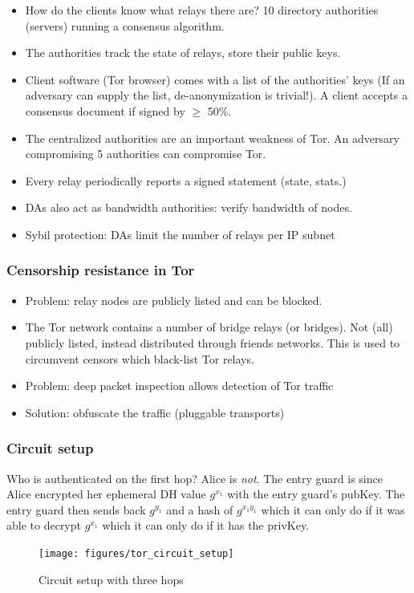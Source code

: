 \begin{itemize}
    \item How do the clients know what relays there are? 10 directory authorities (servers) running a consensus algorithm.
    \item The authorities track the state of relays, store their public keys.
    \item Client software (Tor browser) comes with a list of the authorities’ keys (If an adversary can supply the list, de-anonymization is trivial!). A client accepts a consensus document if signed by $\geq$ 50\%.
    \item The centralized authorities are an important weakness of Tor. An adversary compromising 5 authorities can compromise Tor.
    \item Every relay periodically reports a signed statement (state, stats.) 
    \item DAs also act as bandwidth authorities: verify bandwidth of nodes.
    \item Sybil protection: DAs limit the number of relays per IP subnet
\end{itemize} 

\subsubsection{Censorship resistance in Tor}
\begin{itemize}
    \item Problem: relay nodes are publicly listed and can be blocked.
    \item The Tor network contains a number of bridge relays (or bridges). Not (all) publicly listed, instead distributed through friends networks. This is used to circumvent censors which black-list Tor relays.
    \item Problem: deep packet inspection allows detection of Tor traffic
    \item Solution: obfuscate the traffic (pluggable transports)
\end{itemize}

\subsubsection{Circuit setup}

Who is authenticated on the first hop? Alice is \textit{not}. The entry guard is since Alice encrypted her ephemeral DH value $g^{x_1}$ with the entry guard's pubKey. The entry guard then sends back $g^{y_1}$ and a hash of $g^{x_1y_1}$ which it can only do if it was able to decrypt $g^{x_1}$ which it can only do if it has the privKey.
\begin{figure}[hb]
	\centering
	\texttt{[image: figures/tor\_circuit\_setup]}
	\caption{Circuit setup with three hops}
	\label{fig:torcircuitsetup}
\end{figure}
